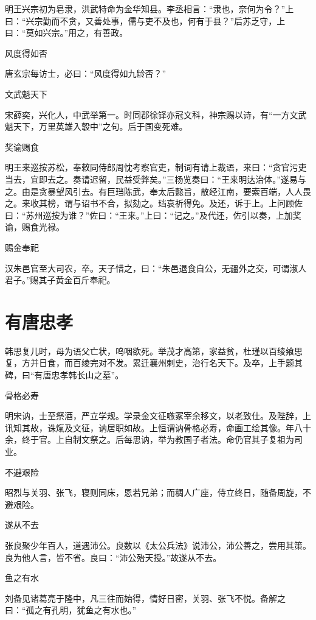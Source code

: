 \documentclass[a4paper,12pt,UTF8,twoside]{ctexbook}
\begin{document}
    明王兴宗初为皂隶，洪武特命为金华知县。李丞相言：“隶也，奈何为令？”上曰：“兴宗勤而不贪，又善处事，儒与吏不及也，何有于县？”后苏乏守，上曰：“莫如兴宗。”用之，有善政。
    
    风度得如否
    
    唐玄宗每访士，必曰：“风度得如九龄否？”
    
    文武魁天下
    
    宋薛奕，兴化人，中武举第一。时同郡徐铎亦冠文科，神宗赐以诗，有“一方文武魁天下，万里英雄入彀中”之句。后于国变死难。
    
    奖谕赐食
    
    明王来巡按苏松，奉敕同侍郎周忱考察官吏，制词有请上裁语，来曰：“贪官污吏当去，宜即去之。奏请迟留，民益受弊矣。”三杨览奏曰：“王来明达治体。”遂易与之。由是贪暴望风引去。有巨珰陈武，奉太后懿旨，散经江南，要索百端，人人畏之。来收其榜，谓与诏书不合，拟劾之。珰哀祈得免。及还，诉于上。上问顾佐曰：“苏州巡按为谁？”佐曰：“王来。”上曰：“记之。”及代还，佐引以奏，上加奖谕，赐食光禄。
    
    赐金奉祀
    
    汉朱邑官至大司农，卒。天子惜之，曰：“朱邑退食自公，无疆外之交，可谓淑人君子。”赐其子黄金百斤奉祀。
    
    \section{有唐忠孝}
    
    韩思复儿时，母为语父亡状，呜咽欲死。举茂才高第，家益贫，杜瑾以百绫飨思复，方并日食，而百绫完对不发。累迁襄州刺史，治行名天下。及卒，上手题其碑，曰“有唐忠孝韩长山之墓”。
    
    骨格必寿
    
    明宋讷，士至祭酒，严立学规。学录金文征嗾冢宰余移文，以老致仕。及陛辞，上讯知其故，诛熂及文征，讷居职如故。上恒谓讷骨格必寿，命画工绘其像。年八十余，终于官。上自制文祭之。后每思讷，举为教国子者法。命仍官其子复祖为司业。
    
    不避艰险
    
    昭烈与关羽、张飞，寝则同床，恩若兄弟；而稠人广座，侍立终日，随备周旋，不避艰险。
    
    遂从不去
    
    张良聚少年百人，道遇沛公。良数以《太公兵法》说沛公，沛公善之，尝用其策。良为他人言，皆不省。良曰：“沛公殆天授。”故遂从不去。
    
    鱼之有水
    
    刘备见诸葛亮于隆中，凡三往而始得，情好日密，关羽、张飞不悦。备解之曰：“孤之有孔明，犹鱼之有水也。”
    
\end{document}
